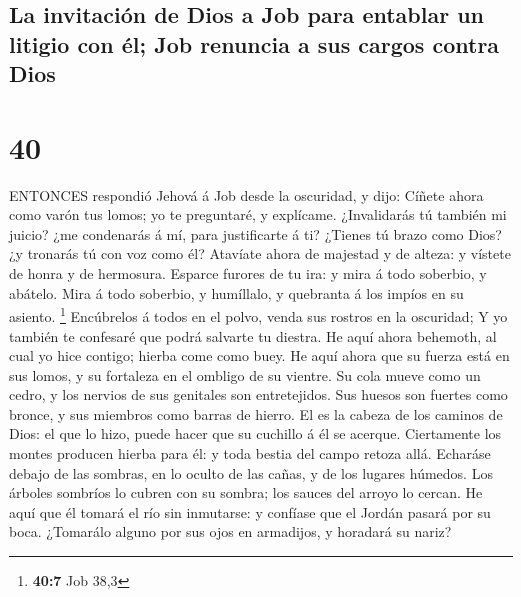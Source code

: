 \hypertarget{la-invitaciuxf3n-de-dios-a-job-para-entablar-un-litigio-con-uxe9l-job-renuncia-a-sus-cargos-contra-dios}{%
\subsection{La invitación de Dios a Job para entablar un litigio con él;
Job renuncia a sus cargos contra
Dios}\label{la-invitaciuxf3n-de-dios-a-job-para-entablar-un-litigio-con-uxe9l-job-renuncia-a-sus-cargos-contra-dios}}

\hypertarget{section-39}{%
\section{40}\label{section-39}}

 ENTONCES respondió Jehová á Job desde la oscuridad, y dijo:
 Cíñete ahora como varón tus lomos; yo te preguntaré, y
explícame.  ¿Invalidarás tú también mi juicio? ¿me
condenarás á mí, para justificarte á ti?  ¿Tienes tú brazo
como Dios? ¿y tronarás tú con voz como él?  Atavíate ahora
de majestad y de alteza: y vístete de honra y de hermosura. 
Esparce furores de tu ira: y mira á todo soberbio, y abátelo.
 Mira á todo soberbio, y humíllalo, y quebranta á los impíos
en su asiento. \footnote{\textbf{40:7} Job 38,3}  Encúbrelos
á todos en el polvo, venda sus rostros en la oscuridad;  Y
yo también te confesaré que podrá salvarte tu diestra.  He
aquí ahora behemoth, al cual yo hice contigo; hierba come como buey.
 He aquí ahora que su fuerza está en sus lomos, y su
fortaleza en el ombligo de su vientre.  Su cola mueve como
un cedro, y los nervios de sus genitales son entretejidos. 
Sus huesos son fuertes como bronce, y sus miembros como barras de
hierro.  El es la cabeza de los caminos de Dios: el que lo
hizo, puede hacer que su cuchillo á él se acerque. 
Ciertamente los montes producen hierba para él: y toda bestia del campo
retoza allá.  Echaráse debajo de las sombras, en lo oculto
de las cañas, y de los lugares húmedos.  Los árboles
sombríos lo cubren con su sombra; los sauces del arroyo lo cercan.
 He aquí que él tomará el río sin inmutarse: y confíase que
el Jordán pasará por su boca.  ¿Tomarálo alguno por sus
ojos en armadijos, y horadará su nariz?  
  

